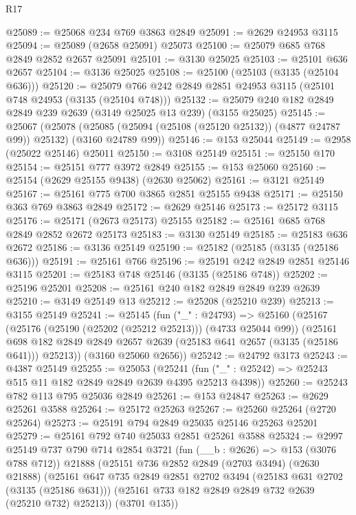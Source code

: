 \begin{lexlean}{R17}
\begin{coremodule}
@25089 := @25068 @234 @769 @3863 @2849
@25091 := @2629 @24953 @3115
@25094 := @25089 (@2658 @25091) @25073
@25100 := @25079 @685 @768 @2849 @2852 @2657 @25091
@25101 := @3130 @25025
@25103 := @25101 @636 @2657
@25104 := @3136 @25025
@25108 := @25100 (@25103 (@3135 (@25104 @636)))
@25120 := @25079 @766 @242 @2849 @2851 @24953 @3115 (@25101 @748 @24953 (@3135 (@25104 @748)))
@25132 := @25079 @240 @182 @2849 @2849 @239 @2639 (@3149 @25025 @13 @239) (@3155 @25025)
@25145 := @25067
    (@25078 (@25085 (@25094 (@25108 (@25120 @25132)) (@4877 @24787 @99)) @25132) (@3160 @24789 @99))
@25146 := @153 @25044
@25149 := @2958 (@25022 @25146) @25011
@25150 := @3108 @25149
@25151 := @25150 @170
@25154 := @25151 @777 @3972 @2849
@25155 := @153 @25060
@25160 := @25154 (@2629 @25155 @9438) (@2630 @25062)
@25161 := @3121 @25149
@25167 := @25161 @775 @700 @3865 @2851 @25155 @9438
@25171 := @25150 @363 @769 @3863 @2849
@25172 := @2629 @25146
@25173 := @25172 @3115
@25176 := @25171 (@2673 @25173) @25155
@25182 := @25161 @685 @768 @2849 @2852 @2672 @25173
@25183 := @3130 @25149
@25185 := @25183 @636 @2672
@25186 := @3136 @25149
@25190 := @25182 (@25185 (@3135 (@25186 @636)))
@25191 := @25161 @766
@25196 := @25191 @242 @2849 @2851 @25146 @3115
@25201 := @25183 @748 @25146 (@3135 (@25186 @748))
@25202 := @25196 @25201
@25208 := @25161 @240 @182 @2849 @2849 @239 @2639
@25210 := @3149 @25149 @13
@25212 := @25208 (@25210 @239)
@25213 := @3155 @25149
@25241 := @25145
    (fun ("_" : @24793) =>
    @25160
      (@25167
        (@25176 (@25190 (@25202 (@25212 @25213))) (@4733 @25044 @99))
        (@25161 @698 @182 @2849 @2849 @2657 @2639 (@25183 @641 @2657 (@3135 (@25186 @641))) @25213))
      (@3160 @25060 @2656))
@25242 := @24792 @3173
@25243 := @4387 @25149
@25255 := @25053
    (@25241 (fun ("_" : @25242) => @25243 @515 @11 @182 @2849 @2849 @2639 @4395 @25213 @4398))
@25260 := @25243 @782 @113 @795 @25036 @2849
@25261 := @153 @24847
@25263 := @2629 @25261 @3588
@25264 := @25172 @25263
@25267 := @25260 @25264 (@2720 @25264)
@25273 := @25191 @794 @2849 @25035 @25146 @25263 @25201
@25279 := @25161 @792 @740 @25033 @2851 @25261 @3588
@25324 := @2997
    @25149
    @737
    @790
    @714
    @2854
    @3721
    (fun (__b : @2626) => @153 (@3076 @788 @712))
    @21888
    (@25151
      @736
      @2852
      @2849
      (@2703 @3494)
      (@2630 @21888)
      (@25161
        @647
        @735
        @2849
        @2851
        @2702
        @3494
        (@25183 @631 @2702 (@3135 (@25186 @631)))
        (@25161 @733 @182 @2849 @2849 @732 @2639 (@25210 @732) @25213))
      (@3701 @135))

\end{coremodule}
\end{lexlean}
